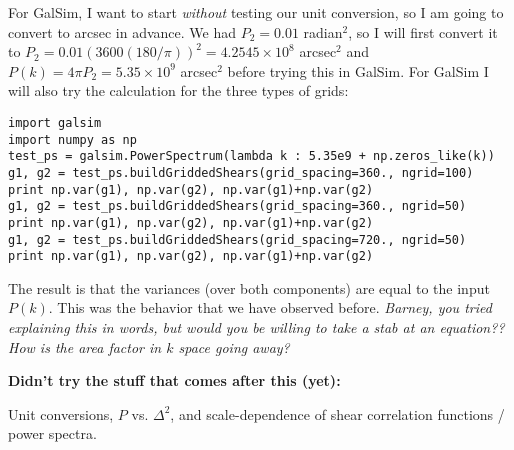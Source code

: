 \documentclass[preprint]{aastex}
\begin{document}
For GalSim, I want to start {\em without} testing our unit conversion,
so I am going to convert to arcsec in advance.  We had $P_2=0.01$
radian$^2$, so I will first convert it to
$P_2=0.01 (3600(180/\pi))^2=4.2545\times 10^8$ arcsec$^2$ and
$P(k)=4\pi P_2 = 5.35\times 10^9$ arcsec$^2$ before trying this in
GalSim.  For GalSim I will also try the calculation for the three
types of grids:
\begin{verbatim}
import galsim
import numpy as np
test_ps = galsim.PowerSpectrum(lambda k : 5.35e9 + np.zeros_like(k))
g1, g2 = test_ps.buildGriddedShears(grid_spacing=360., ngrid=100)
print np.var(g1), np.var(g2), np.var(g1)+np.var(g2)
g1, g2 = test_ps.buildGriddedShears(grid_spacing=360., ngrid=50)
print np.var(g1), np.var(g2), np.var(g1)+np.var(g2)
g1, g2 = test_ps.buildGriddedShears(grid_spacing=720., ngrid=50)
print np.var(g1), np.var(g2), np.var(g1)+np.var(g2)
\end{verbatim}
The result is that the variances (over both components) are equal to
the input $P(k)$.  This was the behavior that we have observed before.  {\em Barney, you tried explaining
  this in words, but would you be willing to take a stab at an
  equation??  How is the area factor in $k$ space going away?}

\textbf{Didn't try the stuff that comes after this (yet):}

Unit conversions, $P$ vs. $\Delta^2$, and scale-dependence of shear
correlation functions / power spectra.
\end{document}
